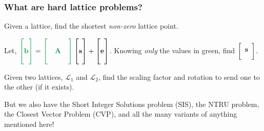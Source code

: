 \documentclass[
aspectratio=169, %
t, %
onlytextwidth, %
10pt, %
]{beamer}
\begin{document}


\begin{frame}
    \frametitle{What are hard lattice problems?}

    \begin{adjustwidth}{0cm}{0cm} %

        \begin{tcolorbox}[colback=ICLBlue!5!white,colframe=ICLBlue,title=\textbf{Definition:} Shortest Vector Problem (SVP)]
            Given a lattice, find the shortest \textit{non-zero} lattice point.
        \end{tcolorbox}

        \begin{tcolorbox}[colback=ICLBlue!5!white,colframe=ICLBlue,title=\textbf{Definition:} Learning With Errors Problem (LWE)]
            Let, $\color{ForestGreen} \begin{bmatrix} \\ \mathbf{b} \\ \\ \end{bmatrix} \color{black} = \color{ForestGreen} \begin{bmatrix} & & \\ & \mathbf{A} & \\ & & \end{bmatrix} \color{black} \begin{bmatrix} \\ \mathbf{s} \\ \\ \end{bmatrix} + \begin{bmatrix} \\ \mathbf{e} \\ \\ \end{bmatrix}$.
            Knowing \textit{only} the values in \color{ForestGreen} green\color{black}, find $\begin{bmatrix} \\ \mathbf{s} \\ \\ \end{bmatrix}$.
        \end{tcolorbox}
        \begin{tcolorbox}[colback=ICLBlue!5!white,colframe=ICLBlue,title=\textbf{Definition:} Lattice Isomorphism Problem (LIP)]
            Given two lattices, $\mathcal{L}_1$ and $\mathcal{L}_2$, find the scaling factor and rotation to send one to the other (if it exists).
        \end{tcolorbox}

        But we also have the Short Integer Solutions problem (SIS), the NTRU problem, the Closest Vector Problem (CVP), and all the many variants of anything mentioned here!

    \end{adjustwidth}
\end{frame}
\end{document}
